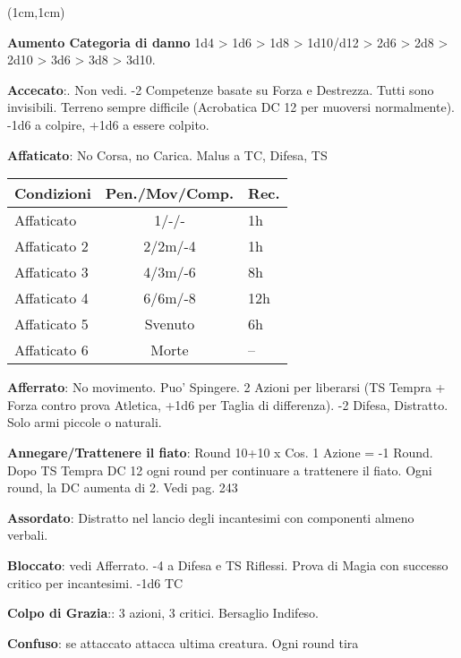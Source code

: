 \documentclass[a4paper,12 pt,openany]{book}
\begin{document}
\center

\footnotesize

\begin{textblock*}{19 cm}(1cm,1cm) %
\flushleft

\begin{multicols}{2}
	
\textbf{Aumento Categoria di danno} 1d4 > 1d6 > 1d8 > 1d10/d12 > 2d6 > 2d8 > 2d10 > 3d6 > 3d8 > 3d10.

\textbf{Accecato}:. Non vedi. -2  Competenze basate su Forza e Destrezza. Tutti sono invisibili. Terreno sempre difficile (Acrobatica DC 12 per muoversi normalmente). -1d6 a colpire, +1d6 a essere colpito.

\textbf{Affaticato}: No Corsa, no Carica. Malus a TC, Difesa, TS

\begin{tabularx}{0.45\textwidth}{lcl}
	\textbf{Condizioni}& \textbf{Pen./Mov/Comp.}&\textbf{Rec.}\\
	\hline
Affaticato  &1/-/-&1h\\
Affaticato 2&2/2m/-4&1h\\
Affaticato 3&4/3m/-6&8h\\
Affaticato 4&6/6m/-8&12h\\
Affaticato 5&Svenuto&6h\\
Affaticato 6&Morte&--
\end{tabularx}

\textbf{Afferrato}: No movimento. Puo' Spingere. 2 Azioni per liberarsi (TS Tempra + Forza contro prova Atletica, +1d6 per Taglia di differenza). -2 Difesa, Distratto. Solo armi piccole o naturali.

\textbf{Annegare/Trattenere il fiato}: Round 10+10 x Cos. 1 Azione = -1 Round. Dopo TS Tempra DC 12 ogni round per continuare a trattenere il fiato. Ogni round, la DC aumenta di 2. Vedi pag. 243

\textbf{Assordato}: Distratto nel lancio degli incantesimi con componenti almeno verbali.

\textbf{Bloccato}: vedi Afferrato. -4 a Difesa e TS Riflessi. Prova di Magia con successo critico per incantesimi. -1d6 TC

\textbf{Colpo di Grazia}:: 3 azioni, 3 critici. Bersaglio Indifeso.

\textbf{Confuso}: se attaccato attacca ultima creatura.
Ogni round tira


\end{multicols}
\end{textblock*}
\end{document}
